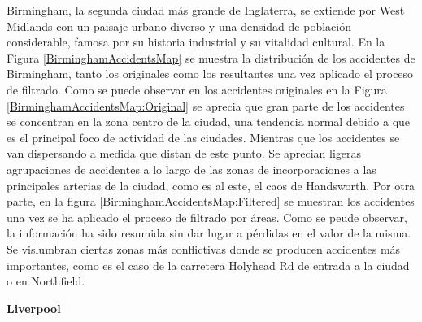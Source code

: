 \documentclass{uathesis-es}
\begin{document}
{	Birmingham, la segunda ciudad más grande de Inglaterra, se extiende por West Midlands con un paisaje urbano diverso y una densidad de población considerable, famosa por su historia industrial y su vitalidad cultural. En la Figura \ref{BirminghamAccidentsMap} se muestra la distribución de los accidentes de Birmingham, tanto los originales como los resultantes una vez aplicado el proceso de filtrado. Como se puede observar en los accidentes originales en la Figura \ref{BirminghamAccidentsMap:Original} se aprecia que gran parte de los accidentes se concentran en la zona centro de la ciudad, una  tendencia normal debido a que es el principal foco de actividad de las ciudades. Mientras que los accidentes se van dispersando a medida que distan de este punto. Se aprecian ligeras agrupaciones de accidentes a lo largo de las zonas de incorporaciones a las principales arterias de la ciudad, como es al este, el caos de Handsworth. Por otra parte, en la figura \ref{BirminghamAccidentsMap:Filtered} se muestran los accidentes una vez se ha aplicado el proceso de filtrado por áreas. Como se peude observar, la información ha sido resumida sin dar lugar a pérdidas en el valor de la misma. Se vislumbran ciertas zonas más conflictivas donde se producen accidentes más importantes, como es el caso de la carretera Holyhead Rd de entrada a la ciudad o en Northfield.
	
	
	
	
	\textbf{Liverpool}\\
	
}
\end{document}
